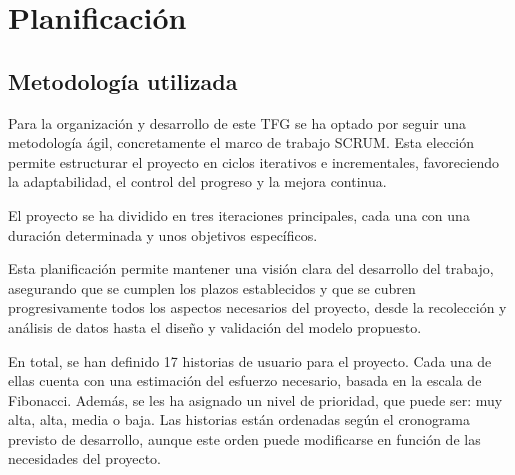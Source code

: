 \chapter{Planificación}

\section{Metodología utilizada}
Para la organización y desarrollo de este TFG se ha optado por seguir una metodología ágil, concretamente el marco de trabajo SCRUM. Esta elección permite estructurar el proyecto en ciclos iterativos e incrementales, favoreciendo la adaptabilidad, el control del progreso y la mejora continua.

El proyecto se ha dividido en tres iteraciones principales, cada una con una duración determinada y unos objetivos específicos. 

Esta planificación permite mantener una visión clara del desarrollo del trabajo, asegurando que se cumplen los plazos establecidos y que se cubren progresivamente todos los aspectos necesarios del proyecto, desde la recolección y análisis de datos hasta el diseño y validación del modelo propuesto.

En total, se han definido 17 historias de usuario para el proyecto. Cada una de ellas cuenta con una estimación del esfuerzo necesario, basada en la escala de Fibonacci. Además, se les ha asignado un nivel de prioridad, que puede ser: muy alta, alta, media o baja. Las historias están ordenadas según el cronograma previsto de desarrollo, aunque este orden puede modificarse en función de las necesidades del proyecto.

